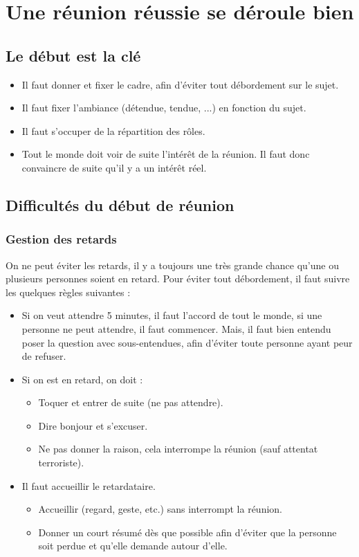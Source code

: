 \section{Une réunion réussie se déroule bien}
\subsection{Le début est la clé}
\begin{itemize}
    \item Il faut donner et fixer le cadre, afin d'éviter tout débordement sur le sujet.
    \item Il faut fixer l'ambiance (détendue, tendue, ...) en fonction du sujet.
    \item Il faut s'occuper de la répartition des rôles.
    \item Tout le monde doit voir de suite l'intérêt de la réunion. Il faut donc convaincre de suite qu'il y a un intérêt réel.
\end{itemize}

\subsection{Difficultés du début de réunion}
\subsubsection{Gestion des retards}
On ne peut éviter les retards, il y a toujours une très grande chance qu'une ou plusieurs personnes soient en retard. Pour éviter tout débordement, il faut suivre les quelques règles suivantes :

\begin{itemize}
    \item Si on veut attendre 5 minutes, il faut l'accord de tout le monde, si une personne ne peut attendre, il faut commencer. Mais, il faut bien entendu poser la question avec sous-entendues, afin d'éviter toute personne ayant peur de refuser.
    \item Si on est en retard, on doit :
    \begin{itemize}
        \item Toquer et entrer de suite (ne pas attendre).
        \item Dire bonjour et s'excuser.
        \item Ne pas donner la raison, cela interrompe la réunion (sauf attentat terroriste).
    \end{itemize}
    \item Il faut accueillir le retardataire.
    \begin{itemize}
        \item Accueillir (regard, geste, etc.) sans interrompt la réunion.
        \item Donner un court résumé dès que possible afin d'éviter que la personne soit perdue et qu'elle demande autour d'elle.
    \end{itemize}
\end{itemize}

